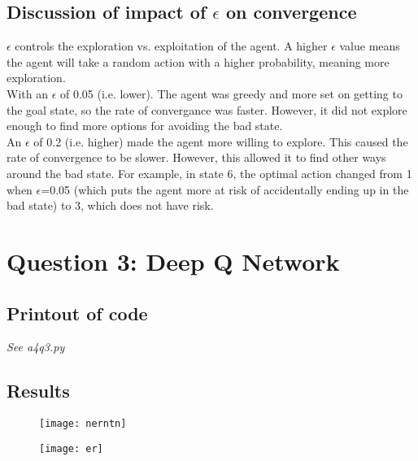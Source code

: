 \documentclass{article}
\begin{document}
  \subsection*{Discussion of impact of $\epsilon$ on convergence}

  $\epsilon$ controls the exploration vs. exploitation of the agent. A higher $\epsilon$ value means the agent will take a
  random action with a higher probability, meaning more exploration. \\

  \noindent
  With an $\epsilon$ of 0.05 (i.e. lower). The agent was greedy and more set on getting to the goal state, so the rate
  of convergance was faster. However, it did not explore enough to find more options for avoiding the bad state. \\

  \noindent
  An $\epsilon$ of 0.2 (i.e. higher) made the agent more willing to explore. This caused the rate of convergence to be
  slower. However, this allowed it to find other ways around the bad state. For example, in state 6, the optimal action
  changed from 1 when $\epsilon$=0.05 (which puts the agent more at risk of accidentally ending up in the bad state)
  to 3, which does not have risk.

\newpage

\section*{Question 3: Deep Q Network}
\normalsize

	\subsection*{Printout of code}

	\textit{See a4q3.py}

  \subsection*{Results}

  \begin{figure}[!ht]
	  \centering
	    \texttt{[image: nerntn]}
		\label{fig:nerntn}
	\end{figure}

  \begin{figure}[!ht]
	  \centering
	    \texttt{[image: er]}
		\label{fig:er}
	\end{figure}
\end{document}
